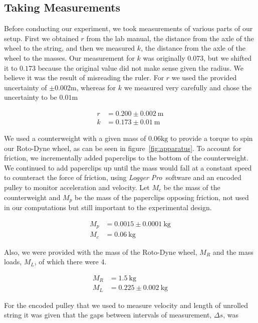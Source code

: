 \documentclass[coverpage]{article}
\newcommand{\softwareText}[1]{\textit{#1}\texttrademark}
\newcommand{\loggerpro}{\softwareText{Logger Pro}}
\newcommand{\rwheel}{Roto-Dyne wheel}
\begin{document}
	\subsection{Taking Measurements}
	
	Before conducting our experiment, we took measurements of various parts of our setup. First we obtained $r$ from the lab manual, the distance from the axle of the wheel to the string, and then we measured $k$, the distance from the axle of the wheel to the masses. Our measurement for $k$ was originally $0.073$, but we shifted it to $0.173$ because the original value did not make sense given the radius. We believe it was the result of misreading the ruler. For $r$ we used the provided uncertainty of $\pm 0.002 \text{m}$, whereas for $k$ we measured very carefully and chose the uncertainty to be $0.01 \text{m}$
	
	\begin{align}
		r&=0.200 \pm 0.002\ \text{m} \label{eq:def-r} \\
		k&=0.173 \pm 0.01\ \text{m} \label{eq:def-k}
	\end{align}

	We used a counterweight with a given mass of $0.06\text{kg}$ to provide a torque to spin our \rwheel, as can be seen in figure~\ref{fig:apparatus}. To account for friction, we incrementally added paperclips to the bottom of the counterweight. We continued to add paperclips up until the mass would fall at a constant speed to counteract the force of friction, using \loggerpro~software and an encoded pulley to monitor acceleration and velocity. Let $M_c$ be the mass of the counterweight and $M_p$ be the mass of the paperclips opposing friction, not used in our computations but still important to the experimental design.
	
	\begin{align}
		M_p&=0.0015 \pm 0.0001\ \text{kg} \label{eq:def-mp} \\
		M_c&=0.06\ \text{kg} \label{eq:def-mc}
	\end{align}

	Also, we were provided with the mass of the \rwheel, $M_R$ and the mass loads, $M_L$, of which there were 4.
	
	\begin{align}
		M_R &= 1.5\ \text{kg} \label{eq:def-mr} \\
		M_L &= 0.225 \pm 0.002\ \text{kg} \label{eq:def-ml}
	\end{align}
	
	For the encoded pulley that we used to measure velocity and length of unrolled string it was given that the gaps between intervals of measurement, $\Delta{s}$, was
	
\end{document}
